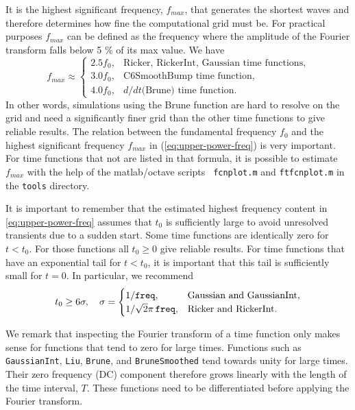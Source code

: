 \documentclass[11pt]{report}
\begin{document}
{It is the highest significant frequency, $f_{max}$, that generates the shortest waves
and therefore determines how fine the computational grid must be. For practical purposes $f_{max}$
can be defined as the frequency where the amplitude of the Fourier transform falls below 5 \% of its
max value. We have
\begin{equation}\label{eq:upper-power-freq}
	f_{max} \approx \begin{cases}
		2.5 f_0, & \mbox{Ricker, RickerInt, Gaussian time functions}, \\
		3.0 f_0, & \mbox{C6SmoothBump time function},                 \\
		4.0 f_0, & \mbox{$d/dt$(Brune) time function}.
	\end{cases}
\end{equation}
In other words, simulations using the Brune function are hard to resolve on the grid and need a
significantly finer grid than the other time functions to give reliable results. The relation
between the fundamental frequency $f_0$ and the highest significant frequency $f_{max}$ in
(\ref{eq:upper-power-freq}) is very important. For time functions that not are listed in that
formula, it is possible to estimate $f_{max}$ with the help of the matlab/octave scripts {\tt
		fcnplot.m} and {\tt ftfcnplot.m} in the {\tt tools} directory.

It is important to remember that the estimated highest frequency content in
\eqref{eq:upper-power-freq} assumes that $t_0$ is sufficiently large to avoid unresolved transients
due to a sudden start. Some time functions are identically zero for $t<t_0$. For those functions all
$t_0\geq 0$ give reliable results. For time functions that have an exponential tail for $t<t_0$, it
is important that this tail is sufficiently small for $t=0$. In particular, we recommend
\[
	t_0 \geq 6\sigma,\quad \sigma=\begin{cases}
		1/{\tt freq},              & \mbox{Gaussian and GaussianInt}, \\
		1/\sqrt{2}\pi\,{\tt freq}, & \mbox{Ricker and RickerInt}.
	\end{cases}
\]

We remark that inspecting the Fourier transform of a time function only makes sense for functions
that tend to zero for large times. Functions such as {\tt GaussianInt}, {\tt Liu}, {\tt Brune}, and
	{\tt BruneSmoothed} tend towards unity for large times. Their zero frequency (DC) component
therefore grows linearly with the length of the time interval, $T$. These functions need to be
differentiated before applying the Fourier transform.

}
\end{document}
